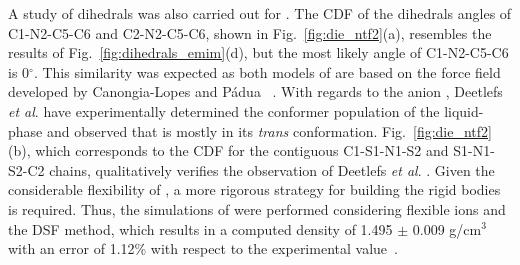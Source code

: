 \documentclass[3p,twocolumn]{elsarticle}
\begin{document}
A study of dihedrals was also carried out for \ce{[emim][NTf_2]}.
The CDF of the dihedrals angles of C1-N2-C5-C6 and C2-N2-C5-C6, shown in Fig.~\ref{fig:die_ntf2}(a), resembles the results of Fig.~\ref{fig:dihedrals_emim}(d), but the most likely angle of C1-N2-C5-C6 is 0$^{\circ}$.
This similarity was expected as both models of \ce{[emim]^+} are based on the force field developed by Canongia-Lopes and P\'{a}dua~ \cite{Canongia_Lopes_2006}.
With regards to the anion \ce{[NTf_2]^-}, Deetlefs \textit{et al}. \cite{Deetlefs_2006} have experimentally determined the conformer population of the liquid-phase and observed that \ce{[NTf_2]^-} is mostly in its \textit{trans} conformation.
Fig.~\ref{fig:die_ntf2}(b), which corresponds to the CDF for the contiguous C1-S1-N1-S2 and S1-N1-S2-C2 chains, qualitatively verifies the observation of Deetlefs \textit{et al}. \cite{Deetlefs_2006}.
Given the considerable flexibility of \ce{[NTf_2]^-}, a more rigorous strategy for building the rigid bodies is required.
Thus, the simulations of \ce{[emim][NTf_2]} were performed considering flexible ions and the DSF method, which results in a computed density of 1.495 $\pm$ 0.009 g/cm$^3$ with an error of 1.12\% with respect to the experimental value~\cite{Tokuda_2005}.
\end{document}
